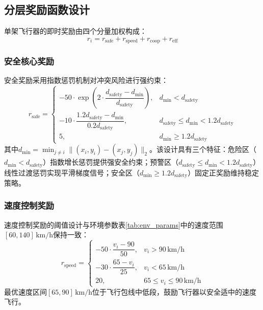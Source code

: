\documentclass[12pt,a4paper,UTF8]{ctexart}
\begin{document}
\subsection{分层奖励函数设计}

单架飞行器的即时奖励由四个分量加权构成：
\begin{equation}
    r_i = r_{\text{safe}} + r_{\text{speed}} + r_{\text{coop}} + r_{\text{eff}}
    \label{eq:total_reward}
\end{equation}

\subsubsection{安全核心奖励}

安全奖励采用指数惩罚机制对冲突风险进行强约束：
\begin{equation}
    r_{\text{safe}} =
    \begin{cases}
        -50 \cdot \exp\left(2 \cdot \dfrac{d_{\text{safety}} - d_{\min}}{d_{\text{safety}}}\right), & d_{\min} < d_{\text{safety}} \\[10pt]
        -10 \cdot \dfrac{1.2d_{\text{safety}} - d_{\min}}{0.2d_{\text{safety}}}, & d_{\text{safety}} \leq d_{\min} < 1.2d_{\text{safety}} \\[10pt]
        5, & d_{\min} \geq 1.2d_{\text{safety}}
    \end{cases}
    \label{eq:rsafe}
\end{equation}
其中$d_{\min} = \min_{j \neq i} \|(x_i, y_i) - (x_j, y_j)\|_2$。该设计具有三个特征：危险区（$d_{\min} < d_{\text{safety}}$）指数增长惩罚提供强安全约束；预警区（$d_{\text{safety}} \leq d_{\min} < 1.2d_{\text{safety}}$）线性过渡惩罚实现平滑梯度信号；安全区（$d_{\min} \geq 1.2d_{\text{safety}}$）固定正奖励维持稳定策略。

\subsubsection{速度控制奖励}

速度控制奖励的阈值设计与环境参数表\ref{tab:env_params}中的速度范围$[60, 140]\,\text{km/h}$保持一致：
\begin{equation}
    r_{\text{speed}} =
    \begin{cases}
        -50 \cdot \dfrac{v_i - 90}{50}, & v_i > 90\,\text{km/h} \\[8pt]
        -30 \cdot \dfrac{65 - v_i}{25}, & v_i < 65\,\text{km/h} \\[8pt]
        20, & 65 \leq v_i \leq 90\,\text{km/h}
    \end{cases}
    \label{eq:rspeed}
\end{equation}
最优速度区间$[65, 90]\,\text{km/h}$位于飞行包线中低段，鼓励飞行器以安全适中的速度飞行。
\end{document}
